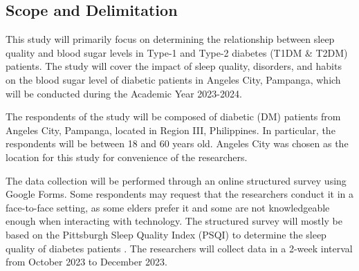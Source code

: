 \subsection*{Scope and Delimitation}

This study will primarily focus on determining the relationship between sleep
quality and blood sugar levels in Type-1 and Type-2 diabetes (T1DM \& T2DM)
patients. The study will cover the impact of sleep quality, disorders, and
habits on the blood sugar level of diabetic patients in Angeles City, Pampanga,
which will be conducted during the Academic Year 2023-2024.

The respondents of the study will be composed of diabetic (DM) patients from
Angeles City, Pampanga, located in Region III, Philippines. In particular, the
respondents will be between 18 and 60 years old. Angeles City was chosen as the
location for this study for convenience of the researchers.

The data collection will be performed through an online structured survey using
Google Forms. Some respondents may request that the researchers conduct it in a
face-to-face setting, as some elders prefer it and some are not knowledgeable
enough when interacting with technology. The structured survey will mostly be
based on the Pittsburgh Sleep Quality Index (PSQI) to determine the sleep
quality of diabetes patients \parencite{xu-2019}. The researchers will collect
data in a 2-week interval from October 2023 to December 2023.
